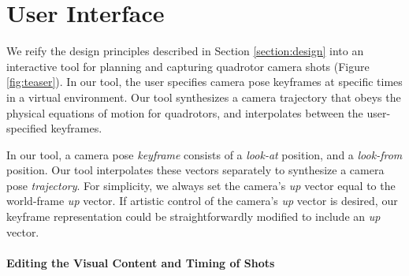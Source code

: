 \section{User Interface}
\label{section:ui}


We reify the design principles described in Section \ref{section:design} into an interactive tool for planning and capturing quadrotor camera shots (Figure \ref{fig:teaser}).
In our tool, the user specifies camera pose keyframes at specific times in a virtual environment.
Our tool synthesizes a camera trajectory that obeys the physical equations of motion for quadrotors, and interpolates between the user-specified keyframes.

In our tool, a camera pose \emph{keyframe} consists of a \emph{look-at} position, and a \emph{look-from} position.
Our tool interpolates these vectors separately to synthesize a camera pose \emph{trajectory}.
For simplicity, we always set the camera's \emph{up} vector equal to the world-frame \emph{up} vector.
If artistic control of the camera's \emph{up} vector is desired, our keyframe representation could be straightforwardly modified to include an \emph{up} vector. 

\paragraph{Editing the Visual Content and Timing of Shots}

